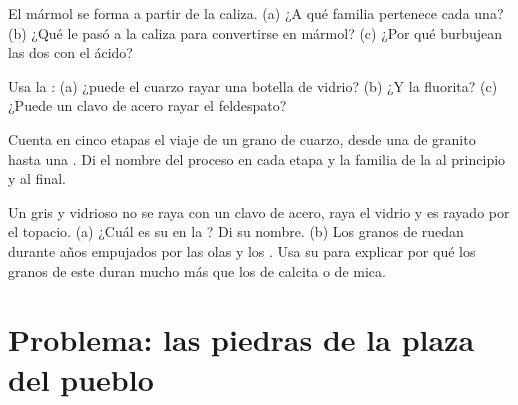 \begin{exercise}[$\star\star$]\label{exo:g6:rocks-and-minerals:9}
El mármol se forma a partir de la caliza. (a) ¿A qué familia pertenece cada
una? (b) ¿Qué le pasó a la caliza para convertirse en mármol? (c) ¿Por qué
burbujean las dos con el ácido?
\end{exercise}

\begin{exercise}[$\star\star$]\label{exo:g6:rocks-and-minerals:10}
Usa la : (a) ¿puede el cuarzo rayar una botella de vidrio?
(b) ¿Y la fluorita? (c) ¿Puede un clavo de acero rayar el feldespato?
\end{exercise}

\begin{exercise}[$\star\star\star$]\label{exo:g6:rocks-and-minerals:11}
Cuenta en cinco etapas el viaje de un grano de cuarzo, desde una  de
granito hasta una . Di el nombre del proceso en cada etapa
y la familia de la  al principio y al final.
\end{exercise}

\begin{exercise}[$\star\star\star$]\label{exo:g6:rocks-and-minerals:12}
Un  gris y vidrioso no se raya con un clavo de acero, raya el
vidrio y es rayado por el topacio. (a) ¿Cuál es su  en la ? Di su nombre. (b) Los granos de  ruedan durante años empujados
por las olas y los . Usa su  para explicar por qué los granos de
este  duran mucho más que los de calcita o de mica.
\end{exercise}

\section{Problema: las piedras de la plaza del pueblo}

